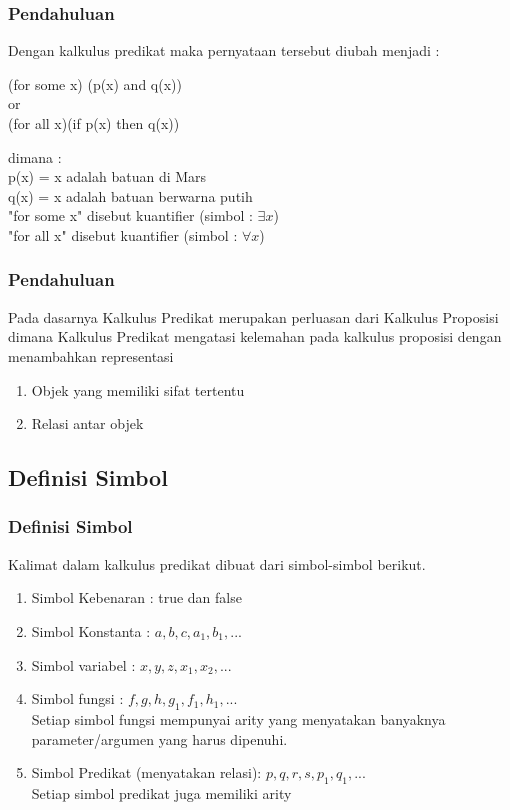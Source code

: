\documentclass[handout]{beamer}
\theoremstyle{definition}
\theoremstyle{example}
\begin{document}
\begin{frame}
	\frametitle{Pendahuluan}
	Dengan kalkulus predikat maka pernyataan tersebut diubah menjadi :\\
	\begin{center}
		\color{blue}
		(for some x) (p(x) and q(x))\\
		or\\
		(for all x)(if p(x) then q(x))\\
	\end{center}
	dimana :\\
	p(x) = x adalah batuan di Mars \\
	q(x) = x adalah batuan berwarna putih\\
	"for some x" disebut kuantifier (simbol : $\exists x$) \\
	"for all x" disebut kuantifier (simbol : $\forall x$) \\
\end{frame}

\begin{frame}
	\frametitle{Pendahuluan}
	Pada dasarnya Kalkulus Predikat merupakan perluasan	dari Kalkulus Proposisi dimana Kalkulus Predikat mengatasi kelemahan pada kalkulus proposisi dengan menambahkan representasi
	\begin{enumerate}
		\item Objek yang memiliki sifat tertentu
	    \item Relasi antar objek
    \end{enumerate}	    
\end{frame}

\subsection{Definisi Simbol}
\begin{frame}
	\frametitle{Definisi Simbol}
	Kalimat dalam kalkulus predikat dibuat dari simbol-simbol berikut.\\
	\begin{enumerate}
		\item Simbol Kebenaran : true dan false
	 	\item Simbol Konstanta : $a, b, c, a_1, b_1, ...$
	 	\item Simbol variabel : $x, y, z, x_1, x_2, ...$
	 	\item Simbol fungsi : $f, g, h, g_1, f_1, h_1, ...$ \\
	Setiap simbol fungsi mempunyai arity yang menyatakan banyaknya parameter/argumen yang harus dipenuhi.
	 	\item Simbol Predikat (menyatakan relasi): $p, q, r, s, p_1, q_1,  ...$\\
	Setiap simbol predikat juga memiliki arity
    \end{enumerate}	 
\end{frame}	
\end{document}
